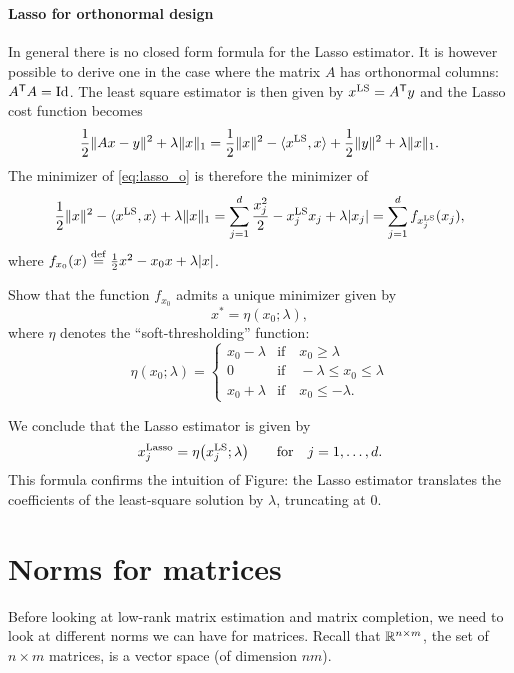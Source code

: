 \documentclass[11pt,nocut]{article}
\begin{document}
\\

\paragraph{Lasso for orthonormal design}
In general there is no closed form formula for the Lasso estimator. It is however possible to derive one in the case where the matrix $A$ has orthonormal columns: $A^{{\sf T}} A = {{\rm Id}}$. 
The least square estimator is then given by $x^{\rm LS} = A^{{\sf T}} y$ and the Lasso cost function becomes
\begin{equation}\label{eq:lasso_o}
\frac{1}{2} \| Ax - y \|^2 + \lambda \|x\|_1 
= \frac{1}{2} \|x\|^2 - \langle x^{\rm LS}, x \rangle + \frac{1}{2} \|y\|^2 + \lambda \|x\|_1.
\end{equation}
The minimizer of \eqref{eq:lasso_o} is therefore the minimizer of
$$
\frac{1}{2} \|x\|^2 - \langle x^{\rm LS}, x \rangle + \lambda \|x\|_1
=
\sum_{j=1}^d \frac{x_j^2}{2} - x^{\rm LS}_j x_j + \lambda |x_j| 
=
\sum_{j=1}^d f_{x_j^{\rm LS}}(x_j),
$$
where $f_{x_0}(x) \overset{\rm def}{=} \frac{1}{2}x^2 - x_0 x + \lambda |x|$.

\begin{exercise}
	Show that the function $f_{x_0}$ admits a unique minimizer given by
	$$
	x^* = \eta(x_0; \lambda),
	$$
	where $\eta$ denotes the ``soft-thresholding'' function:
	$$
	\eta(x_0;\lambda) = 
	\begin{cases}
		x_0-\lambda & \text{if} \quad x_0 \geq \lambda \\
		0 & \text{if} \quad -\lambda \leq x_0 \leq \lambda \\
		x_0 + \lambda & \text{if} \quad x_0 \leq -\lambda.
	\end{cases}
	$$
\end{exercise}
\vspace{2mm}

We conclude that the Lasso estimator is given by
$$
x^{\rm Lasso}_{j} = \eta\big(x_j^{\rm LS}; \lambda\big) \qquad \text{for} \quad j=1, \dots, d.
$$
This formula confirms the intuition of Figure: the Lasso estimator translates the coefficients of the least-square solution by $\lambda$, truncating at $0$.

\section{Norms for matrices}

Before looking at low-rank matrix estimation and matrix completion, we need to look at different norms we can have for matrices. Recall that $\mathbb{R}^{n \times m}$, the set of $n \times m$ matrices, is a vector space (of dimension $nm$).
\\
\end{document}
